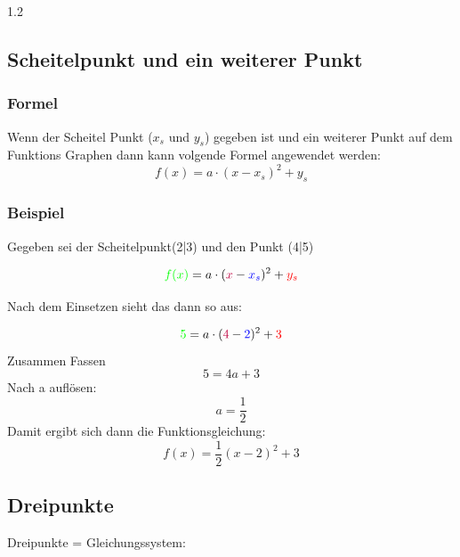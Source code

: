 \documentclass{article}
\newcommand{\Zeilenabstand}{1.2}
\begin{document}
\begin{spacing}{\Zeilenabstand}
    \subsection{Scheitelpunkt und ein weiterer Punkt}

    \subsubsection{Formel}

    Wenn der Scheitel Punkt ($x_{s}$ und $y_{s}$) gegeben ist 
    und ein weiterer Punkt auf dem Funktions Graphen dann kann volgende 
    Formel angewendet werden:
    \begin{equation}
        f(x)=a \cdot (x-x_s)^2 +y_s    
    \end{equation}

    \subsubsection{Beispiel}

    Gegeben sei der Scheitelpunkt({\color{blue}2}|{\color{red}3}) und den Punkt
    ({\color{purple}4}|{\color{green}5})

    \begin{equation}
        {\color{green}f(x)}=a \cdot ({\color{purple}x}-{\color{blue}x_s})^2 + {\color{red}y_s}    
    \end{equation}

    Nach dem Einsetzen sieht das dann so aus:

    \begin{equation}
        {\color{green}5}=a \cdot ({\color{purple}4}-{\color{blue}2})^2 + {\color{red}3}    
    \end{equation}
    Zusammen Fassen
    \begin{equation}
        5=4a+3
    \end{equation}
    Nach a auflösen:
    \begin{equation}
        a = \frac{1}{2}
    \end{equation}
    Damit ergibt sich dann die Funktionsgleichung:
    \begin{equation}
        f(x)=\frac{1}{2}(x-2)^2+3
    \end{equation}


    \subsection{Dreipunkte}
    Dreipunkte = Gleichungssystem:


\end{spacing}
\end{document}
